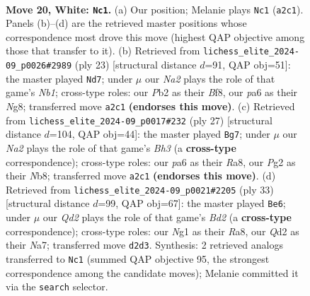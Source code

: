 \documentclass[11pt]{article}
\begin{document}
\clearpage

\begin{figure}[p]\centering
\begin{subfigure}{0.46\textwidth}\centering
\resizebox{\linewidth}{!}{%
\newchessgame
\chessboard[
  setfen={rnb1r3/3nqk1p/pp2p1p1/2p1P3/P2p4/8/NPPQ1PPP/1K2RBNR w - - 2 20},
  showmover=false,
  pgfstyle=straightmove, color=movearrow, markmove={a2-c1}
]}
\caption{}
\end{subfigure}\hfill
\begin{subfigure}{0.46\textwidth}\centering
\resizebox{\linewidth}{!}{%
\newchessgame
\chessboard[
  setfen={rn2kbnr/pp3ppp/4p3/1P1pP3/q7/2PQ1N2/P2N1PPP/R1B2RK1 b kq - 2 12},
  showmover=false,
  pgfstyle=straightmove, color=movearrow, markmove={b8-d7}
]}
\caption{}
\end{subfigure}
\\[4pt]
\begin{subfigure}{0.46\textwidth}\centering
\resizebox{\linewidth}{!}{%
\newchessgame
\chessboard[
  setfen={rnb1r1k1/1p2P2p/2pq2pb/3p4/p1P5/P2P1NP1/1P2QPBP/RN2R1K1 b - - 0 14},
  showmover=false,
  pgfstyle=straightmove, color=movearrow, markmove={h6-g7}
]}
\caption{}
\end{subfigure}\hfill
\begin{subfigure}{0.46\textwidth}\centering
\resizebox{\linewidth}{!}{%
\newchessgame
\chessboard[
  setfen={r1r3k1/np1b1ppp/1q6/pP1pPp2/P2P4/R3NN2/5PPP/3Q1RK1 b - - 2 17},
  showmover=false,
  pgfstyle=straightmove, color=movearrow, markmove={d7-e6}
]}
\caption{}
\end{subfigure}
\caption{\textbf{Move 20, White: \texttt{Nc1}.} (a) Our position; Melanie plays \texttt{Nc1} (\texttt{a2c1}). Panels (b)--(d) are the retrieved master positions whose correspondence most drove this move (highest QAP objective among those that transfer to it). (b) Retrieved from \texttt{lichess\_elite\_2024-09\_p0026\#2989} (ply 23) [structural distance $d$=91, QAP obj=51]: the master played \texttt{Nd7}; under $\mu$ our \emph{Na2} plays the role of that game's \emph{Nb1}; cross-type roles: our \emph{P}b2 as their \emph{B}f8, our \emph{p}a6 as their \emph{N}g8; transferred move \texttt{a2c1} \textbf{(endorses this move)}. (c) Retrieved from \texttt{lichess\_elite\_2024-09\_p0017\#232} (ply 27) [structural distance $d$=104, QAP obj=44]: the master played \texttt{Bg7}; under $\mu$ our \emph{Na2} plays the role of that game's \emph{Bh3} (a \textbf{cross-type} correspondence); cross-type roles: our \emph{p}a6 as their \emph{R}a8, our \emph{P}g2 as their \emph{N}b8; transferred move \texttt{a2c1} \textbf{(endorses this move)}. (d) Retrieved from \texttt{lichess\_elite\_2024-09\_p0021\#2205} (ply 33) [structural distance $d$=99, QAP obj=67]: the master played \texttt{Be6}; under $\mu$ our \emph{Qd2} plays the role of that game's \emph{Bd2} (a \textbf{cross-type} correspondence); cross-type roles: our \emph{N}g1 as their \emph{R}a8, our \emph{Q}d2 as their \emph{N}a7; transferred move \texttt{d2d3}. Synthesis: 2 retrieved analogs transferred to \texttt{Nc1} (summed QAP objective 95, the strongest correspondence among the candidate moves); Melanie committed it via the \texttt{search} selector.}
\label{fig:thought-m38}
\end{figure}
\end{document}

